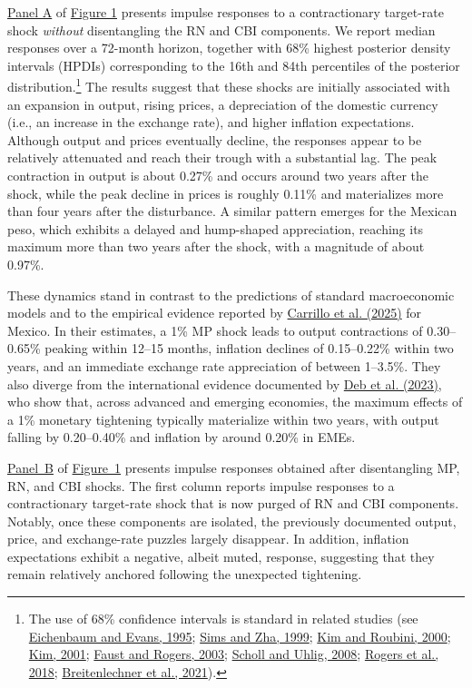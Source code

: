 \documentclass[\latexroot/\projectname]{subfiles}
\begin{document}
\hyperlink{Panel BF1}{Panel A} of \hyperlink{Figure 1}{Figure 1} presents impulse responses to a contractionary target-rate shock \emph{without} disentangling the RN and CBI components. We report median responses over a 72-month horizon, together with 68\% highest posterior density intervals (HPDIs) corresponding to the 16th and 84th percentiles of the posterior distribution.\footnote{The use of 68\% confidence intervals is standard in related studies (see \hyperlink{Eichenbaum and Evans (1995)}{Eichenbaum and Evans, 1995}; \hyperlink{Sims and Zha (1999)}{Sims and Zha, 1999}; \hyperlink{Kim and Roubini (2000)}{Kim and Roubini, 2000}; \hyperlink{Kim (2001)}{Kim, 2001}; \hyperlink{Faust and Rogers (2003)}{Faust and Rogers, 2003}; \hyperlink{Scholl and Uhlig (2008)}{Scholl and Uhlig, 2008}; \hyperlink{Rogers et al. (2018)}{Rogers et al., 2018}; \hyperlink{Breitenlechner et al. (2021)}{Breitenlechner et al., 2021}).}   The results suggest that these shocks are initially associated with an expansion in output, rising prices, a depreciation of the domestic currency (i.e., an increase in the exchange rate), and higher inflation expectations. Although output and prices eventually decline, the responses appear to be relatively attenuated and reach their trough with a substantial lag. The peak contraction in output is about 0.27\% and occurs around two years after the shock, while the peak decline in prices is roughly 0.11\% and materializes more than four years after the disturbance. A similar pattern emerges for the Mexican peso, which exhibits a delayed and hump-shaped appreciation, reaching its maximum more than two years after the shock, with a magnitude of about 0.97\%.

These dynamics stand in contrast to the predictions of standard macroeconomic models and to the empirical evidence reported by \hyperlink{Carrillo et al. (2025)}{Carrillo et al. (2025)} for Mexico. In their estimates, a 1\% MP shock leads to output contractions of 0.30--0.65\% peaking within 12--15 months, inflation declines of 0.15--0.22\% within two years, and an immediate exchange rate appreciation of between 1--3.5\%. They also diverge from the international evidence documented by \hyperlink{Deb et al. (2023)}{Deb et al. (2023)}, who show that, across advanced and emerging economies, the maximum effects of a 1\% monetary tightening typically materialize within two years, with output falling by 0.20--0.40\% and inflation by around 0.20\% in EMEs.


\hyperlink{Panel BF1}{Panel~B} of \hyperlink{Figure~1}{Figure~1} presents impulse responses obtained after disentangling MP, RN, and CBI shocks. The first column reports impulse responses to a contractionary target-rate shock that is now purged of RN and CBI components. Notably, once these components are isolated, the previously documented output, price, and exchange-rate puzzles largely disappear. In addition, inflation expectations exhibit a negative, albeit muted, response, suggesting that they remain relatively anchored following the unexpected tightening. 
\end{document}
